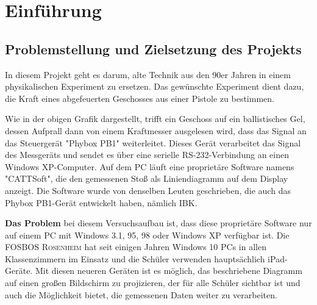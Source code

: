 \section{Einführung}
\label{sec:Introduction}



\subsection{Problemstellung und Zielsetzung des Projekts}
\label{sec:Problemstellung und Zielsetzung des Projekts}

In diesem Projekt geht es darum, alte Technik aus den 90er Jahren in einem physikalischen Experiment zu ersetzen. Das gewünschte Experiment dient dazu, die Kraft eines abgefeuerten Geschosses aus einer Pistole zu bestimmen.

\begin{figure}[htb]
\centering
{}
\end{figure}

Wie in der obigen Grafik dargestellt, trifft ein Geschoss auf ein ballistisches Gel, dessen Aufprall dann von einem Kraftmesser ausgelesen wird, dass das Signal an das Steuergerät "Phybox PB1" weiterleitet. Dieses Gerät verarbeitet das Signal des Messgeräts und sendet es über eine serielle RS-232-Verbindung an einen Windows XP-Computer. Auf dem PC läuft eine proprietäre Software namens "CATTSoft", die den gemessenen Stoß als Liniendiagramm auf dem Display anzeigt. Die Software wurde von denselben Leuten geschrieben, die auch das Phybox PB1-Gerät entwickelt haben, nämlich \ac{IBK}.

\textbf{Das Problem} bei diesem Versuchsaufbau ist, dass diese proprietäre Software nur auf einem \ac{PC} mit Windows 3.1, 95, 98 oder Windows XP verfügbar ist. Die \textsc{FOSBOS Rosenheim} hat seit einigen Jahren Windows 10 \ac{PC}s in allen Klassenzimmern im Einsatz und die Schüler verwenden hauptsächlich iPad-Geräte. Mit diesen neueren Geräten ist es möglich, das beschriebene Diagramm auf einen großen Bildschirm zu projizieren, der für alle Schüler sichtbar ist und auch die Möglichkeit bietet, die gemessenen Daten weiter zu verarbeiten.

